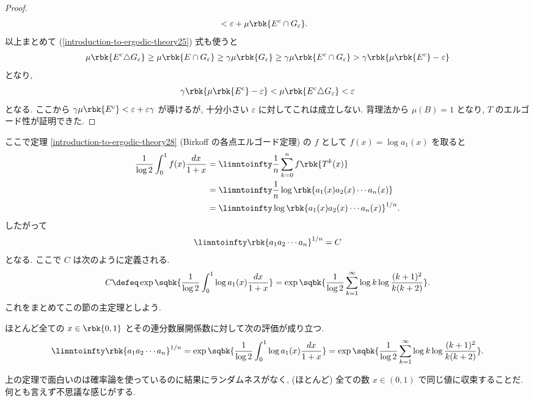 \documentclass[openany, a4paper, oneside]{jsbook}
\begin{document}
\begin{proof}
\begin{align}
 &<
 \varepsilon + \mu \rbk{E^c \cap G_{\varepsilon}}.
\end{align}
以上まとめて (\ref{introduction-to-ergodic-theory25}) 式も使うと
\begin{align}
 \mu \rbk{E^c \triangle G_{\varepsilon}}
 \geq
 \mu \rbk{E \cap G_{\varepsilon}}
 \geq
 \gamma \mu \rbk{G_{\varepsilon}}
 \geq
 \gamma \mu \rbk{E^c \cap G_{\varepsilon}}
 >
 \gamma \rbk{\mu \rbk{E^c} - \varepsilon}
\end{align}
となり,
\begin{align}
 \gamma \rbk{\mu \rbk{E^c} - \varepsilon}
 <
 \mu \rbk{E^c \triangle G_{\varepsilon}}
 <
 \varepsilon
\end{align}
となる.
ここから $\gamma \mu \rbk{E^c} < \varepsilon + \varepsilon \gamma$ が導けるが,
十分小さい $\varepsilon$ に対してこれは成立しない.
背理法から $\mu (B) = 1$ となり, $T$ のエルゴード性が証明できた.
\end{proof}

ここで定理 \ref{introduction-to-ergodic-theory28} (Birkoff の各点エルゴード定理) の
$f$ として $f(x) = \log a_1(x)$ を取ると
\begin{align}
 \frac{1}{\log 2} \int_0^1 f(x) \frac{dx}{1+x}
 &=
 \limntoinfty \frac{1}{n} \sum_{k=0}^n f \rbk{T^k(x)} \\
 &=
 \limntoinfty \frac{1}{n} \log \rbk{a_1(x) a_2(x) \cdots a_n(x)} \\
 &=
 \limntoinfty \log \rbk{a_1(x) a_2(x) \cdots a_n(x)}^{1/n}.
\end{align}
したがって
\begin{align}
 \limntoinfty \rbk{a_1 a_2 \cdots a_n}^{1/n}
 =
 C
\end{align}
となる.
ここで $C$ は次のように定義される.
\begin{align}
 C
 \defeq
 \exp \sqbk{\frac{1}{\log 2} \int_0^1 \log a_1(x) \frac{dx}{1+x}}
 =
 \exp \sqbk{\frac{1}{\log 2} \sum_{k=1}^{\infty} \log k \log \frac{(k+1)^2}{k (k+2)}}.
\end{align}
これをまとめてこの節の主定理としよう.
\begin{thm}
ほとんど全ての $x \in \rbk{0,1}$ とその連分数展開係数に対して次の評価が成り立つ.
\begin{align}
 \limntoinfty \rbk{a_1 a_2 \cdots a_n}^{1/n}
 =
 \exp \sqbk{\frac{1}{\log 2} \int_0^1 \log a_1(x) \frac{dx}{1+x}}
 =
 \exp \sqbk{\frac{1}{\log 2} \sum_{k=1}^{\infty} \log k \log \frac{(k+1)^2}{k (k+2)}}.
\end{align}
\end{thm}
\begin{rem}
上の定理で面白いのは確率論を使っているのに結果にランダムネスがなく,
(ほとんど) 全ての数 $x \in (0, 1)$ で同じ値に収束することだ.
何とも言えず不思議な感じがする.
\end{rem}
\end{document}
